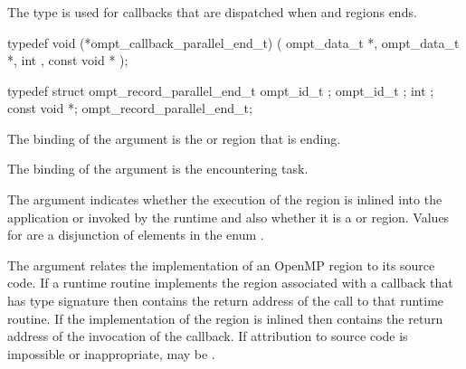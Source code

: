 \subsubsection{}
\label{sec:ompt_callback_parallel_end_t}

\summary
The  type is used for callbacks 
that are dispatched when  and  regions ends.

\format
\begin{ccppspecific}
\begin{omptCallback}
typedef void (*ompt_callback_parallel_end_t) (
  ompt_data_t *,
  ompt_data_t *,
  int ,
  const void *
);
\end{omptCallback}
\end{ccppspecific}

\record
\begin{ccppspecific}
\begin{omptRecord}
typedef struct ompt_record_parallel_end_t {
  ompt_id_t ;
  ompt_id_t ;
  int ;
  const void *;
} ompt_record_parallel_end_t;
\end{omptRecord}
\end{ccppspecific}


\argdesc
The binding of the  argument is the  or 
 region that is ending.

The binding of the  argument is the encountering task.

The  argument indicates whether the execution of the region is inlined 
into the application or invoked by the runtime and also whether it is a 
 or  region. Values for  are a
disjunction of elements in the enum .

The  argument relates the implementation of an OpenMP region
to its source code. If a runtime routine implements the region associated with
a callback that has type signature  then
 contains the return address of the call to that runtime routine.
If the implementation of the region is inlined then  contains the
return address of the invocation of the callback. If attribution to source code
is impossible or inappropriate,  may be .

